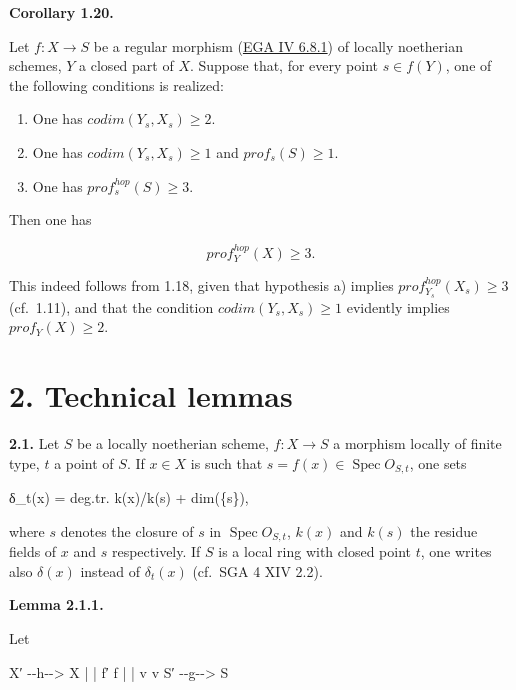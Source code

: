 \documentclass[
  11pt,
  a4paper,
]{book}
\newenvironment{Shaded}{}{}
\newcommand{\NormalTok}[1]{#1}
\begin{document}
\textbf{Corollary 1.20.}

Let \(f : X \to S\) be a regular morphism
(\href{https://jcreinhold.github.io/ega/iv/18-ch4-06-flat-morphisms.html\#68-regular-normal-reduced-smooth-morphisms}{EGA
IV 6.8.1}) of locally noetherian schemes, \(Y\) a closed part of \(X\).
Suppose that, for every point \(s \in f(Y)\), one of the following
conditions is realized:

\begin{enumerate}
\def\labelenumi{\alph{enumi})}
\item
  One has \(codim(Y_{s}, X_{s}) \geqslant 2\).
\item
  One has \(codim(Y_{s}, X_{s}) \geqslant 1\) and
  \(prof_{s}(S) \geqslant 1\).
\item
  One has \(prof^{hop}_{s}(S) \geqslant 3\).
\end{enumerate}

Then one has

\[ prof^{hop}_{Y}(X) \geqslant 3. \]

This indeed follows from 1.18, given that hypothesis a) implies
\(prof^{hop}_{Y_{s}}(X_{s}) \geqslant 3\) (cf.~1.11), and that the
condition \(codim(Y_{s}, X_{s}) \geqslant 1\) evidently implies
\(prof_{Y}(X) \geqslant 2\).

\section{2. Technical lemmas}\label{technical-lemmas}

\textbf{2.1.} Let \(S\) be a locally noetherian scheme, \(f : X \to S\)
a morphism locally of finite type, \(t\) a point of \(S\). If
\(x \in X\) is such that \(s = f(x) \in \operatorname{Spec} O_{S,t}\),
one sets

\begin{Shaded}
\begin{Highlighting}[]
\NormalTok{δ\_t(x) = deg.tr. k(x)/k(s) + dim(\{s\}),}
\end{Highlighting}
\end{Shaded}

where \({s}\) denotes the closure of \(s\) in
\(\operatorname{Spec} O_{S,t}\), \(k(x)\) and \(k(s)\) the residue
fields of \(x\) and \(s\) respectively. If \(S\) is a local ring with
closed point \(t\), one writes also \(\delta(x)\) instead of
\(\delta_{t}(x)\) (cf.~SGA 4 XIV 2.2).

\textbf{Lemma 2.1.1.}

Let

\begin{Shaded}
\begin{Highlighting}[]
\NormalTok{X′ {-}{-}h{-}{-}\textgreater{} X}
\NormalTok{|         |}
\NormalTok{f′        f}
\NormalTok{|         |}
\NormalTok{v         v}
\NormalTok{S′ {-}{-}g{-}{-}\textgreater{} S}
\end{Highlighting}
\end{Shaded}
\end{document}
